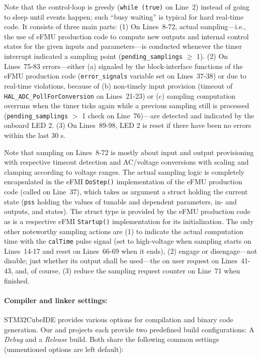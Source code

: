 \noindent{}Note that the control-loop is greedy (\texttt{while (true)} on Line~2) instead of going to sleep until events happen; such ``busy waiting'' is typical for hard real-time code. It consists of three main parts: (1) On Lines~8-72, actual sampling---i.e., the use of eFMU production code to compute new outputs and internal control states for the given inputs and parameters---is conducted whenever the timer interrupt indicated a sampling point (\texttt{pending\_samplings} $\geq$ 1). (2) On Lines~75-83 errors---either (a) signaled by the block-interface functions of the eFMU production code (\texttt{error\_signals} variable set on Lines~37-38) or due to real-time violations, because of (b) non-timely input provision (timeout of \texttt{HAL\_ADC\_PollForConversion} on Lines~21-23) or (c) sampling computation overruns when the timer ticks again while a previous sampling still is processed (\texttt{pending\_samplings} $>$ 1 check on Line~76)---are detected and indicated by the onboard LED 2. (3) On Lines~89-98, LED 2 is reset if there have been no errors within the last 30 s.

Note that sampling on Lines~8-72 is mostly about input and output provisioning with respective timeout detection and AC/voltage conversions with scaling and clamping according to voltage ranges. The actual sampling logic is completely encapsulated in the eFMI \texttt{DoStep()} implementation of the eFMU production code (called on Line~37), which takes as argument a struct holding the current \controller{} state (\texttt{pss} holding the values of tunable and dependent parameters, in- and outputs, and states). The struct type is provided by the eFMU production code as is a respective eFMI \texttt{Startup()} implementation for its initialization. The only other noteworthy sampling actions are (1) to indicate the actual computation time with the \texttt{calTime} pulse signal (set to high-voltage when sampling starts on Lines~14-17 and reset on Lines~66-69 when it ends), (2) engage or disengage---not disable; just whether its output shall be used---the \controller{} on user request on Lines~41-43, and, of course, (3) reduce the sampling request counter on Line~71 when finished.

\paragraph{Compiler and linker settings:}

STM32CubeIDE provides various options for compilation and binary code generation. Our \controller{} and \plant{} projects each provide two predefined build configurations: A \textit{Debug} and a \textit{Release} build. Both share the following common settings (unmentioned options are left default):

